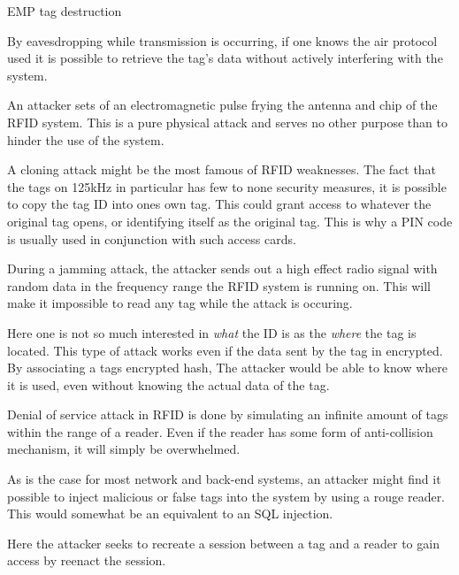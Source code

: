 \begin{labeling}{EMP tag destruction}
    \item[Skimming] By eavesdropping while transmission is occurring, if one knows the air protocol used it is possible to retrieve the tag's data without actively interfering with the system.
    
    \item[EMP tag destruction] An attacker sets of an electromagnetic pulse frying the antenna and chip of the RFID system. This is a pure physical attack and serves no other purpose than to hinder the use of the system.
    
    \item[Cloning] A cloning attack might be the most famous of RFID weaknesses. The fact that the tags on 125kHz in particular has few to none security measures, it is possible to copy the tag ID into ones own tag. This could grant access to whatever the original tag opens, or identifying itself as the original tag. This is why a PIN code is usually used in conjunction with such access cards.
    
    \item[Jamming] During a jamming attack, the attacker sends out a high effect radio signal with random data in the frequency range the RFID system is running on. This will make it impossible to read any tag while the attack is occuring.
    
    \item[Location] Here one is not so much interested in \textit{what} the ID is as the \textit{where} the tag is located. This type of attack works even if the data sent by the tag in encrypted. By associating a tags encrypted hash, The attacker would be able to know where it is used, even without knowing the actual data of the tag. 
    
    \item[DoS] Denial of service attack in RFID is done by simulating an infinite amount of tags within the range of a reader. Even if the reader has some form of anti-collision mechanism, it will simply be overwhelmed.
    
    \item[Input Validation] As is the case for most network and back-end systems, an attacker might find it possible to inject malicious or false tags into the system by using a rouge reader. This would somewhat be an equivalent to an SQL injection.
    
    \item[Replay] Here the attacker seeks to recreate a session between a tag and a reader to gain access by reenact the session.
\end{labeling}

